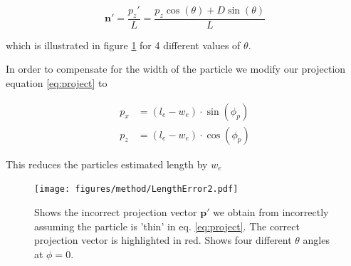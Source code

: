 \begin{equation}
\mathbf{n}' = \frac{p_z'}{L} = \frac{p_z\cos(\theta)  + D\sin(\theta)}{L} 
\end{equation}

which is illustrated in figure \ref{fig:lengtherror} for 4 different values of $\theta$. 

In order to compensate for the width of the particle we modify our projection equation \ref{eq:project} to

\begin{align}\label{eq:widthCompensation}
p_x  &= (l_e - w_e)\cdot \sin(\phi_p) \\
p_z  &= (l_e - w_e)\cdot \cos(\phi_p) 
\end{align}


This reduces the particles estimated length by $w_e$
\begin{figure}[H]
\centering
\texttt{[image: figures/method/LengthError2.pdf]}
\caption{Shows the incorrect projection vector $\mathbf{p}'$ we obtain from incorrectly assuming the particle is 'thin' in eq. \ref{eq:project}. The correct projection vector is highlighted in red. Shows four different $\theta$ angles at $\phi=0$.}\label{fig:lengtherror}
\end{figure} 

